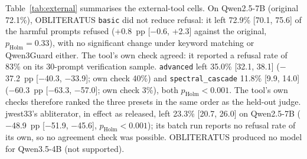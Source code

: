 Table~\ref{tab:external} summarises the external-tool cells. On Qwen2.5-7B (original 72.1\%), OBLITERATUS
\texttt{basic} did not reduce refusal: it left 72.9\% [70.1, 75.6] of the harmful prompts refused (+0.8~pp [$-$0.6, +2.3] against the original, $p_\mathrm{Holm}=0.33$), with no significant
change under keyword matching or Qwen3Guard either. The tool's own check agreed: it reported a refusal rate of 83\% on
its 30-prompt verification sample. \texttt{advanced} left 35.0\% [32.1, 38.1] ($-$37.2~pp [$-$40.3, $-$33.9]; own
check 40\%) and \texttt{spectral\_cascade} 11.8\% [9.9, 14.0] ($-$60.3~pp [$-$63.3, $-$57.0]; own check 3\%), both
$p_\mathrm{Holm}<0.001$. The tool's own checks therefore ranked the three presets in the same order as the held-out
judge. jwest33's abliterator, in effect as released, left 23.3\% [20.7, 26.0] on Qwen2.5-7B ($-$48.9~pp [$-$51.9,
$-$45.6], $p_\mathrm{Holm}<0.001$); its batch run reports no refusal rate of its own, so no agreement check was
possible. OBLITERATUS produced no model for Qwen3.5-4B (not supported).

